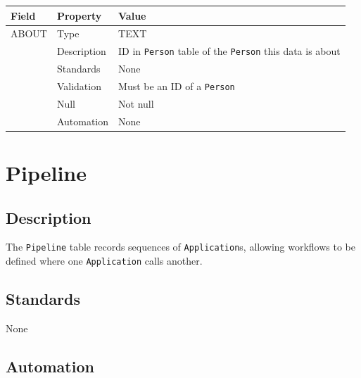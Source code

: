 \documentclass[
]{article}
\newcounter{none}
\begin{document}
{\def\LTcaptype{none} 
\begin{longtable}[]{@{}
  >{\raggedright\arraybackslash}p{}
  >{\raggedright\arraybackslash}p{}
  >{\raggedright\arraybackslash}p{}@{}}
\toprule\noalign{}
\begin{minipage}[b]{\linewidth}\raggedright
Field
\end{minipage} & \begin{minipage}[b]{\linewidth}\raggedright
Property
\end{minipage} & \begin{minipage}[b]{\linewidth}\raggedright
Value
\end{minipage} \\
\midrule\noalign{}
\endhead
\bottomrule\noalign{}
\endlastfoot
ABOUT & Type & TEXT \\
& Description & ID in \texttt{Person} table of the \texttt{Person} this
data is about \\
& Standards & None \\
& Validation & Must be an ID of a \texttt{Person} \\
& Null & Not null \\
& Automation & None \\
\end{longtable}
}

\section{Pipeline}\label{pipeline}

\subsection{Description}\label{description-22}

The \texttt{Pipeline} table records sequences of \texttt{Application}s,
allowing workflows to be defined where one \texttt{Application} calls
another.

\subsection{Standards}\label{standards-24}

None

\subsection{Automation}\label{automation-24}
\end{document}

